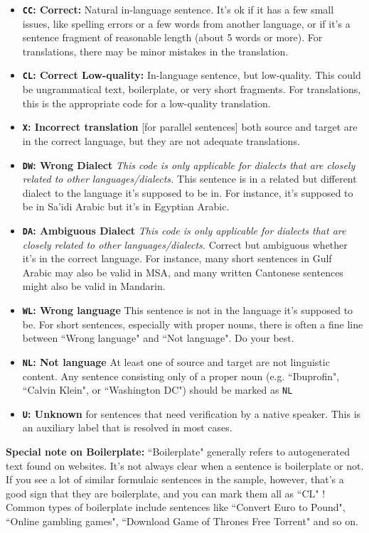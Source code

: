\begin{itemize}
    \item \textbf{\texttt{CC}: Correct:} Natural in-language sentence. It's ok if it has a few small issues, like spelling errors or a few words from another language, or if it’s a sentence fragment of reasonable length (about 5 words or more). For translations, there may be minor mistakes in the translation.
    \item \textbf{\texttt{\texttt{CL}}: Correct Low-quality:} In-language sentence, but low-quality. This could be ungrammatical text, boilerplate, or very short fragments. For translations, this is the appropriate code for a low-quality translation.
    \item \textbf{\texttt{X}: Incorrect translation} [for parallel sentences] both source and target are in the correct language, but they are not adequate translations.
    \item \textbf{\texttt{DW}: Wrong Dialect} \textit{This code is only applicable for dialects that are closely related to other languages/dialects.} This sentence is in a related but different dialect to the language it's supposed to be in. For instance, it's supposed to be in Sa'idi Arabic but it's in Egyptian Arabic.
    \item \textbf{\texttt{DA}: Ambiguous Dialect} \textit{This code is only applicable for dialects that are closely related to other languages/dialects.} Correct but ambiguous whether it's in the correct language. For instance, many short sentences in Gulf Arabic may also be valid in MSA, and many written Cantonese sentences might also be valid in Mandarin.
    \item \textbf{\texttt{WL}: Wrong language} This sentence is not in the language it's supposed to be. For short sentences, especially with proper nouns, there is often a fine line between ``Wrong language" and ``Not language". Do your best.
    \item \textbf{\texttt{NL}: Not language} At least one of source and target are not linguistic content. Any sentence consisting only of a proper noun (e.g. ``Ibuprofin", ``Calvin Klein", or ``Washington DC") should be marked as \texttt{NL}
    \item \textbf{\texttt{U}: Unknown} for sentences that need verification by a native speaker. This is an auxiliary label that is resolved in most cases.
\end{itemize}

\textbf{Special note on Boilerplate:} ``Boilerplate" generally refers to autogenerated text found on websites. It's not always clear when a sentence is boilerplate or not. If you see a lot of similar formulaic sentences in the sample, however, that's a good sign that they are boilerplate, and you can mark them all as ``CL" ! Common types of boilerplate include sentences like ``Convert Euro to Pound", ``Online gambling games", ``Download Game of Thrones Free Torrent" and so on.


